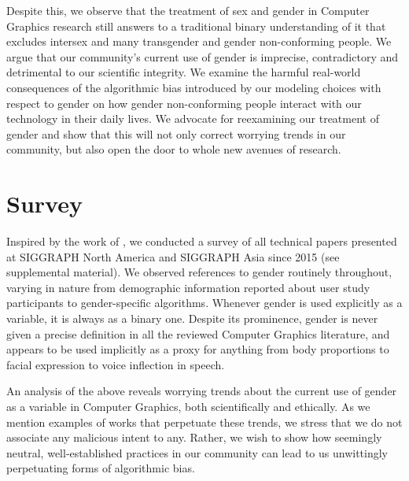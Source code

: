 \documentclass[nonacm,sigconf,review,balance=false]{acmart}
\begin{document}
Despite this, we observe that the treatment of sex and gender in Computer Graphics research
still answers to a traditional binary understanding of it that excludes intersex and many transgender and
gender non-conforming people. We argue that our community's current use of gender is
imprecise, contradictory and detrimental to our scientific integrity.
We examine the harmful real-world consequences of the algorithmic bias introduced by our modeling
choices with respect to gender on how gender non-conforming people interact with
our technology in their daily lives. We advocate for reexamining our
treatment of gender and show that this will not only correct worrying trends in
our community, but also open the door to whole new avenues of research.

\section{Survey}


Inspired by the work of \citet{keyes2018misgendering}, we conducted a survey of
all technical papers presented at SIGGRAPH North America and SIGGRAPH Asia since
2015 (see supplemental material). We observed references to gender routinely
throughout, varying in nature from demographic information reported about user
study participants to gender-specific algorithms. Whenever gender is used
explicitly as a variable, it is always as a binary one. Despite its prominence,
gender is never given a precise definition in all the reviewed Computer Graphics
literature, and appears to be used implicitly as a proxy for anything from body
proportions to facial expression to voice inflection in speech.

An analysis of the above reveals worrying trends about the current use of gender
as a variable in Computer Graphics, both scientifically and ethically. As we
mention examples of works that perpetuate these trends, we stress that we do not
associate any malicious intent to any.  Rather, we wish to show how seemingly
neutral, well-established practices in our community can lead to us unwittingly
perpetuating forms of algorithmic bias.
\end{document}
